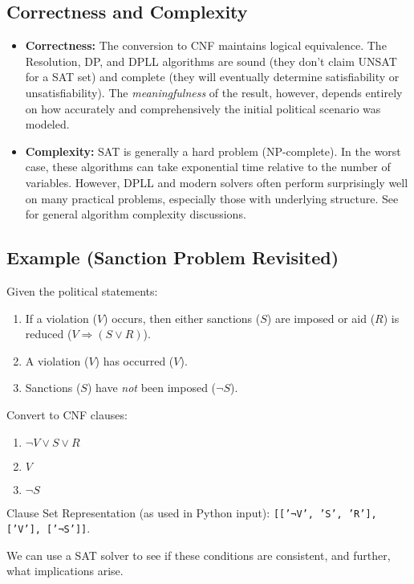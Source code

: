 \documentclass[11pt, a4paper]{article}
\begin{document}
\subsection*{Correctness and Complexity}

\begin{itemize}
    \item \textbf{Correctness:} The conversion to CNF maintains logical equivalence. The Resolution, DP, and DPLL algorithms are sound (they don't claim UNSAT for a SAT set) and complete (they will eventually determine satisfiability or unsatisfiability). The \textit{meaningfulness} of the result, however, depends entirely on how accurately and comprehensively the initial political scenario was modeled.
    \item \textbf{Complexity:} SAT is generally a hard problem (NP-complete). In the worst case, these algorithms can take exponential time relative to the number of variables. However, DPLL and modern solvers often perform surprisingly well on many practical problems, especially those with underlying structure. See \cite{Cormen1996} for general algorithm complexity discussions.
\end{itemize}

\subsection*{Example (Sanction Problem Revisited)}
Given the political statements:
\begin{enumerate}
    \item If a violation ($V$) occurs, then either sanctions ($S$) are imposed or aid ($R$) is reduced ($V \Rightarrow (S \vee R)$).
    \item A violation ($V$) has occurred ($V$).
    \item Sanctions ($S$) have \textit{not} been imposed ($\neg S$).
\end{enumerate}

Convert to CNF clauses:
\begin{enumerate}
    \item $\neg V \vee S \vee R$
    \item $V$
    \item $\neg S$
\end{enumerate}

Clause Set Representation (as used in Python input): \texttt{[['¬V', 'S', 'R'], ['V'], ['¬S']]}.

We can use a SAT solver to see if these conditions are consistent, and further, what implications arise.
\end{document}
